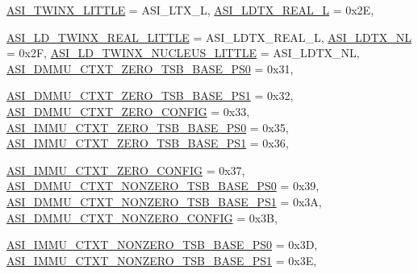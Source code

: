 \begin{DoxyCompactItemize}
\hyperlink{namespaceSparcISA_a6dd43f1311515252b283f56d7095a1f3a8f054dd427581a9c4a0cb2ae72fa75ec}{ASI\_\-TWINX\_\-LITTLE} =  ASI\_\-LTX\_\-L, 
\hyperlink{namespaceSparcISA_a6dd43f1311515252b283f56d7095a1f3a7c8c541db440a125c1e2d40b6d81b0a8}{ASI\_\-LDTX\_\-REAL\_\-L} =  0x2E, 
\par
\hyperlink{namespaceSparcISA_a6dd43f1311515252b283f56d7095a1f3a536978db6c80690e4e6df60f2ba605d1}{ASI\_\-LD\_\-TWINX\_\-REAL\_\-LITTLE} =  ASI\_\-LDTX\_\-REAL\_\-L, 
\hyperlink{namespaceSparcISA_a6dd43f1311515252b283f56d7095a1f3a3c7d34ee470568a374f7ba49e7c36c46}{ASI\_\-LDTX\_\-NL} =  0x2F, 
\hyperlink{namespaceSparcISA_a6dd43f1311515252b283f56d7095a1f3a44639cfeec9ee07146e0e0d14c30c1b4}{ASI\_\-LD\_\-TWINX\_\-NUCLEUS\_\-LITTLE} =  ASI\_\-LDTX\_\-NL, 
\hyperlink{namespaceSparcISA_a6dd43f1311515252b283f56d7095a1f3a79d80f1dc735b1bf94db306867765cf0}{ASI\_\-DMMU\_\-CTXT\_\-ZERO\_\-TSB\_\-BASE\_\-PS0} =  0x31, 
\par
\hyperlink{namespaceSparcISA_a6dd43f1311515252b283f56d7095a1f3a02ffd985f08d0f930403e9e3183997de}{ASI\_\-DMMU\_\-CTXT\_\-ZERO\_\-TSB\_\-BASE\_\-PS1} =  0x32, 
\hyperlink{namespaceSparcISA_a6dd43f1311515252b283f56d7095a1f3a9127fbcda67c82b315d3a91fc245a42e}{ASI\_\-DMMU\_\-CTXT\_\-ZERO\_\-CONFIG} =  0x33, 
\hyperlink{namespaceSparcISA_a6dd43f1311515252b283f56d7095a1f3ad6d094185ca66a67ce2d96a07b27b9df}{ASI\_\-IMMU\_\-CTXT\_\-ZERO\_\-TSB\_\-BASE\_\-PS0} =  0x35, 
\hyperlink{namespaceSparcISA_a6dd43f1311515252b283f56d7095a1f3aed27b34cf4c8494150a1159c04139356}{ASI\_\-IMMU\_\-CTXT\_\-ZERO\_\-TSB\_\-BASE\_\-PS1} =  0x36, 
\par
\hyperlink{namespaceSparcISA_a6dd43f1311515252b283f56d7095a1f3ad4cee8abff015247865fd75aff81dd5b}{ASI\_\-IMMU\_\-CTXT\_\-ZERO\_\-CONFIG} =  0x37, 
\hyperlink{namespaceSparcISA_a6dd43f1311515252b283f56d7095a1f3a3a09de027e5e8d32fe1d8f036f44038a}{ASI\_\-DMMU\_\-CTXT\_\-NONZERO\_\-TSB\_\-BASE\_\-PS0} =  0x39, 
\hyperlink{namespaceSparcISA_a6dd43f1311515252b283f56d7095a1f3ae485b3d0dcadda627264a2b94293d0dd}{ASI\_\-DMMU\_\-CTXT\_\-NONZERO\_\-TSB\_\-BASE\_\-PS1} =  0x3A, 
\hyperlink{namespaceSparcISA_a6dd43f1311515252b283f56d7095a1f3a9e6fd0719e3846fca804369478bf8d69}{ASI\_\-DMMU\_\-CTXT\_\-NONZERO\_\-CONFIG} =  0x3B, 
\par
\hyperlink{namespaceSparcISA_a6dd43f1311515252b283f56d7095a1f3aeeb6893031be8b60b1c4d695e9afd72e}{ASI\_\-IMMU\_\-CTXT\_\-NONZERO\_\-TSB\_\-BASE\_\-PS0} =  0x3D, 
\hyperlink{namespaceSparcISA_a6dd43f1311515252b283f56d7095a1f3a058db0e724aefaf2ebf5e6d8ee7089aa}{ASI\_\-IMMU\_\-CTXT\_\-NONZERO\_\-TSB\_\-BASE\_\-PS1} =  0x3E, 

\end{DoxyCompactItemize}
